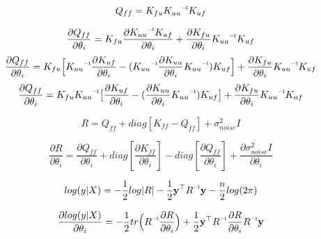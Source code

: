 \documentclass{article}
\newcommand\inv[1]{#1\raisebox{1.15ex}{$\scriptscriptstyle-\!1$}}
\begin{document}
  \begin{equation}
    Q_{ff} = K_{fu}  \inv{K_{uu}}  K_{uf}
  \end{equation}

  \begin{equation}
    \frac{\partial Q_{ff}}{\partial \theta_{i}} =
    K_{fu}  \frac{\partial {\inv{K_{uu}}  K_{uf}}}{\partial \theta_{i}} +
    {\frac{\partial K_{fu}}{\partial \theta_{i}}}  {\inv{K_{uu}}  K_{uf}}
  \end{equation}
  \begin{equation}
    \frac{\partial Q_{ff}}{\partial \theta_{i}} =
    K_{fu}  \Big[ \inv{K_{uu}}  \frac{\partial K_{uf}}{\partial \theta_{i}}  -
      (\inv{K_{uu}}  \frac{\partial K_{uu}}{\partial \theta_{i}}  \inv{K_{uu}})  K_{uf}
        \Big] +
        \frac{\partial K_{fu}}{\partial \theta_{i}}  \inv{K_{uu}}  K_{uf}
  \end{equation}
  \begin{equation}
    \frac{\partial Q_{ff}}{\partial \theta_{i}} =
    K_{fu}  \inv{K_{uu}}  \big[ \frac{\partial K_{uf}}{\partial \theta_{i}}  -
      (\frac{\partial K_{uu}}{\partial \theta_{i}}  \inv{K_{uu}})  K_{uf}
        \big] +
        \frac{\partial K_{fu}}{\partial \theta_{i}}  \inv{K_{uu}}  K_{uf}
  \end{equation}

  \begin{equation}
    R = Q_{ff} + diag[{K_{ff} - Q_{ff}}] + \sigma^{2}_{noise} I
  \end{equation}

  \begin{equation}
    \frac{\partial R}{\partial \theta_{i}} = \frac{\partial Q_{ff}}{\partial \theta_{i}}
    + diag[\frac{\partial K_{ff}}{\partial \theta_{i}}]
    - diag[\frac{\partial Q_{ff}}{\partial \theta_{i}}]
    + \frac{\partial \sigma^{2}_{noise} I }{\partial \theta_{i}}
  \end{equation}

  \begin{equation}
    log(y | X) = -\frac{1}{2}log | R | -  \frac{1}{2} \textbf{y}^\top \inv{R} \textbf{y}
    - \frac{n}{2} log(2 \pi)
  \end{equation}


  \begin{equation}
    \frac{\partial log(y | X)}{\partial \theta_{i}} =
    - \frac{1}{2} tr \Big(\inv{R} \frac{{\partial R}}{\partial \theta_{i}} \Big)
    + \frac{1}{2} \textbf{y}^{\top} \inv{R} \frac{\partial R}{\partial \theta_{i}} \inv{R} \textbf{y}
  \end{equation}
\end{document}
